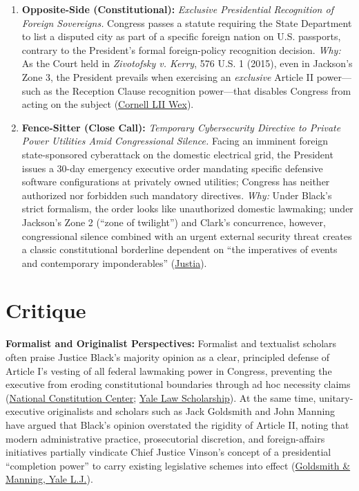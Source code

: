 \documentclass[12pt]{article}
\begin{document}
\begin{enumerate}
\item \textbf{Opposite-Side (Constitutional):} \textit{Exclusive Presidential Recognition of Foreign Sovereigns.} Congress passes a statute requiring the State Department to list a disputed city as part of a specific foreign nation on U.S. passports, contrary to the President's formal foreign-policy recognition decision. \textit{Why:} As the Court held in \textit{Zivotofsky v. Kerry}, 576 U.S. 1 (2015), even in Jackson's Zone 3, the President prevails when exercising an \textit{exclusive} Article II power---such as the Reception Clause recognition power---that disables Congress from acting on the subject (\href{https://www.law.cornell.edu/wex/youngstown_sheet_tube_co._v._sawyer_\%281952\%29}{Cornell LII Wex}).

\item \textbf{Fence-Sitter (Close Call):} \textit{Temporary Cybersecurity Directive to Private Power Utilities Amid Congressional Silence.} Facing an imminent foreign state-sponsored cyberattack on the domestic electrical grid, the President issues a 30-day emergency executive order mandating specific defensive software configurations at privately owned utilities; Congress has neither authorized nor forbidden such mandatory directives. \textit{Why:} Under Black's strict formalism, the order looks like unauthorized domestic lawmaking; under Jackson's Zone 2 (``zone of twilight'') and Clark's concurrence, however, congressional silence combined with an urgent external security threat creates a classic constitutional borderline dependent on ``the imperatives of events and contemporary imponderables'' (\href{https://supreme.justia.com/cases/federal/us/343/579/}{Justia}).
\end{enumerate}

\section{Critique}
\textbf{Formalist and Originalist Perspectives:} Formalist and textualist scholars often praise Justice Black's majority opinion as a clear, principled defense of Article I's vesting of all federal lawmaking power in Congress, preventing the executive from eroding constitutional boundaries through ad hoc necessity claims (\href{https://constitutioncenter.org/blog/the-youngstown-case-three-approaches-to-interpreting-presidential-power}{National Constitution Center}; \href{https://openyls.law.yale.edu/server/api/core/bitstreams/6d79e130-b40f-4083-bbb4-5f93642bb432/content}{Yale Law Scholarship}). At the same time, unitary-executive originalists and scholars such as Jack Goldsmith and John Manning have argued that Black's opinion overstated the rigidity of Article II, noting that modern administrative practice, prosecutorial discretion, and foreign-affairs initiatives partially vindicate Chief Justice Vinson's concept of a presidential ``completion power'' to carry existing legislative schemes into effect (\href{https://openyls.law.yale.edu/bitstreams/d907a40e-541f-45f4-b625-3aa1d23c542b/download}{Goldsmith \& Manning, Yale L.J.}).
\end{document}
